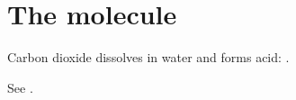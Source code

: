 \documentclass{article}
\begin{document}
\section{The  molecule}\label{water}
Carbon dioxide dissolves in water and forms acid: .

See .
\end{document}
